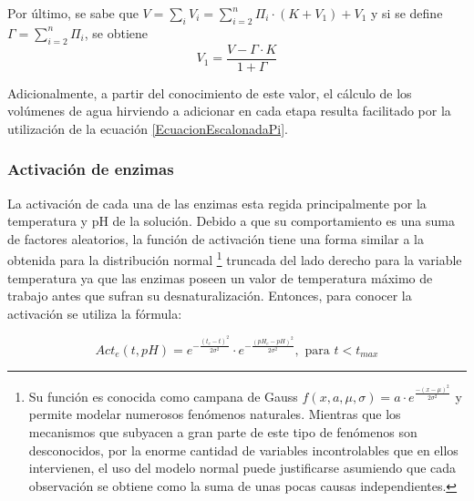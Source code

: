\begin{itemize}
                \par Por último, se sabe que $V = \sum_i V_i = \sum_{i=2}^{n} \Pi_i \cdot(K + V_1) + V_1$ y si se define $\Gamma = \sum_{i=2}^n \Pi_i$, se obtiene
                \begin{equation}
                    V_1 = \frac{V - \Gamma \cdot K}{1 + \Gamma}
                \label{EcuacionEscalonadaGamma}
                \end{equation}
                
                \par Adicionalmente, a partir del conocimiento de este valor, el cálculo de los volúmenes de agua hirviendo a adicionar en cada etapa resulta facilitado por la utilización de la ecuación \ref{EcuacionEscalonadaPi}.
            \end{itemize} %
            
        \subsubsection{Activación de enzimas}
        \par La activación de cada una de las enzimas esta regida principalmente por la temperatura y pH de la solución. Debido a que su comportamiento es una suma de factores aleatorios, la función de activación tiene una forma similar a la obtenida para la distribución normal \footnote{Su función es conocida como campana de Gauss $f(x,a,\mu, \sigma) = a\cdot e^{\frac{-(x - \mu)^2}{2\sigma^2}}$ y permite modelar numerosos fenómenos naturales. Mientras que los mecanismos que subyacen a gran parte de este tipo de fenómenos son desconocidos, por la enorme cantidad de variables incontrolables que en ellos intervienen, el uso del modelo normal puede justificarse asumiendo que cada observación se obtiene como la suma de unas pocas causas independientes.} truncada del lado derecho para la variable temperatura ya que las enzimas poseen un valor de temperatura máximo de trabajo antes que sufran su desnaturalización. Entonces, para conocer la activación se utiliza la fórmula:
        
        \begin{equation}
            Act_e(t, pH) = e^{- \frac{(t_e - t)^2}{2\sigma^2}} \cdot e^{- \frac{(pH_e - pH)^2}{2\sigma^2}}, \text{ para }t< t_{max}
            \label{EcuacionActivacionEnzimas}
        \end{equation}
        
